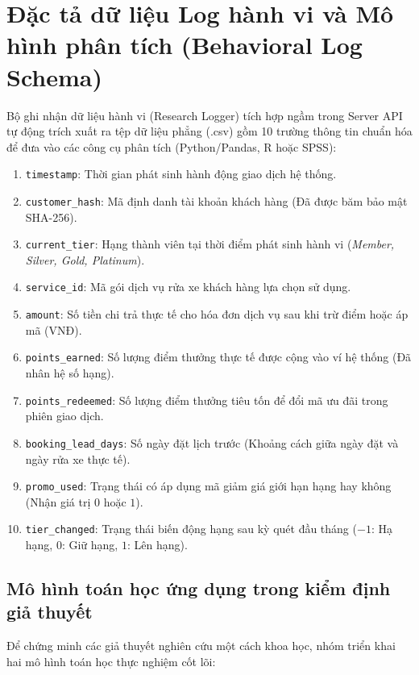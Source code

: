 \section{Đặc tả dữ liệu Log hành vi và Mô hình phân tích (Behavioral Log Schema)}
Bộ ghi nhận dữ liệu hành vi (Research Logger) tích hợp ngầm trong Server API tự động trích xuất ra tệp dữ liệu phẳng (.csv) gồm 10 trường thông tin chuẩn hóa để đưa vào các công cụ phân tích (Python/Pandas, R hoặc SPSS):

\begin{enumerate}
    \item \texttt{timestamp}: Thời gian phát sinh hành động giao dịch hệ thống.
    \item \texttt{customer\_hash}: Mã định danh tài khoản khách hàng (Đã được băm bảo mật SHA-256).
    \item \texttt{current\_tier}: Hạng thành viên tại thời điểm phát sinh hành vi (\textit{Member, Silver, Gold, Platinum}).
    \item \texttt{service\_id}: Mã gói dịch vụ rửa xe khách hàng lựa chọn sử dụng.
    \item \texttt{amount}: Số tiền chi trả thực tế cho hóa đơn dịch vụ sau khi trừ điểm hoặc áp mã (VNĐ).
    \item \texttt{points\_earned}: Số lượng điểm thưởng thực tế được cộng vào ví hệ thống (Đã nhân hệ số hạng).
    \item \texttt{points\_redeemed}: Số lượng điểm thưởng tiêu tốn để đổi mã ưu đãi trong phiên giao dịch.
    \item \texttt{booking\_lead\_days}: Số ngày đặt lịch trước (Khoảng cách giữa ngày đặt và ngày rửa xe thực tế).
    \item \texttt{promo\_used}: Trạng thái có áp dụng mã giảm giá giới hạn hạng hay không (Nhận giá trị $0$ hoặc $1$).
    \item \texttt{tier\_changed}: Trạng thái biến động hạng sau kỳ quét đầu tháng ($-1$: Hạ hạng, $0$: Giữ hạng, $1$: Lên hạng).
\end{enumerate}

\subsection{Mô hình toán học ứng dụng trong kiểm định giả thuyết}
Để chứng minh các giả thuyết nghiên cứu một cách khoa học, nhóm triển khai hai mô hình toán học thực nghiệm cốt lõi:

